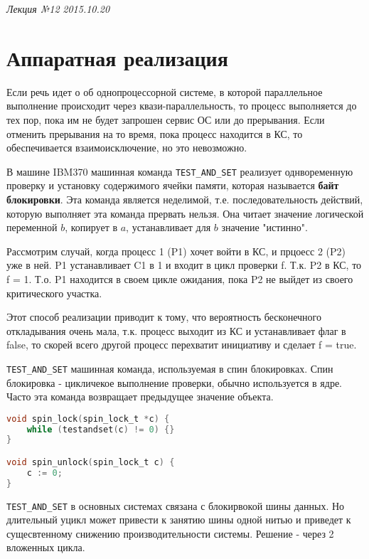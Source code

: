 \clearpage
\begin{flushright}
    \textit{Лекция №12}
    \textit{2015.10.20}
\end{flushright}

\section{Аппаратная реализация}

Если речь идет о об однопроцессорной системе, в которой параллельное выполнение происходит через квази-параллельность, то процесс выполняется до тех пор, пока им не будет запрошен сервис ОС или до прерывания. Если отменить прерывания на то время, пока процесс находится в КС, то обеспечивается взаимоисключение, но это невозможно.

В машине IBM370 машинная команда \verb|TEST_AND_SET| реализует однвоременную проверку  и установку содержимого ячейки памяти, которая называется \textbf{байт блокировки}. Эта команда является неделимой, т.е. последовательность действий, которую выполняет эта команда прервать нельзя. Она читает значение логической переменной $b$, копирует в $a$, устанавливает для $b$ значение "истинно".

Рассмотрим случай, когда процесс 1 (P1) хочет войти в КС, и прцоесс 2 (P2) уже в ней. P1 устанавливает C1 в 1 и входит в цикл проверки f. Т.к. P2 в КС, то f = 1. Т.о. P1 находится в своем цикле ожидания, пока P2 не выйдет из своего критического участка.

Этот способ реализации приводит к тому, что вероятность бесконечного откладывания очень мала, т.к. процесс выходит из КС и устанавливает флаг в false, то скорей всего другой процесс перехватит инициативу и сделает f = true.

\verb|TEST_AND_SET| машинная команда, используемая в спин блокировках. Спин блокировка - цикличекое выполнение проверки, обычно используется в ядре. Часто эта команда возвращает предыдущее значение объекта.

\begin{lstlisting}[language=c]
void spin_lock(spin_lock_t *c) {
	while (testandset(c) != 0) {}
}

void spin_unlock(spin_lock_t c) {
	c := 0;
}
\end{lstlisting}

\verb|TEST_AND_SET| в основных системах связана с блокирвокой шины данных. Но длительный уцикл может привести к занятию шины одной нитью и приведет к сущесвтенному снижению производительности системы. Решение - через 2 вложенных цикла.



